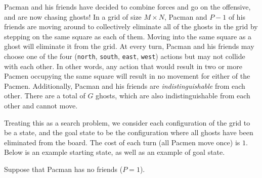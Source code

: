 \documentclass[11pt, a4paper]{exam}
\begin{document}
\begin{exercises}[1, 3 (a)--(c), 5]
Pacman and his friends have decided to combine forces and go on the offensive, and are now chasing ghosts! In a grid of size $M \times N$, Pacman and $P - 1$ of his friends are moving around to collectively eliminate all of the ghosts in the grid by stepping on the same square as each of them. Moving into the same square as a ghost will eliminate it from the grid. At every turn, Pacman and his friends may choose one of the four (\texttt{north}, \texttt{south}, \texttt{east}, \texttt{west}) actions but may not collide with each other. In other words, any action that would result in two or more Pacmen occupying the same square will result in no movement for either of the Pacmen. Additionally, Pacman and his friends are \emph{indistinguishable} from each other. There are a total of $G$ ghosts, which are also indistinguishable from each other and cannot move.

Treating this as a search problem, we consider each configuration of the grid to be a state, and the goal state to be the configuration where all ghosts have been eliminated from the board. The cost of each turn (all Pacmen move once) is $1$. Below is an example starting state, as well as an example of goal state.

\begin{center}
\end{center}

Suppose that Pacman has no friends ($P=1$).

\end{exercises}
\end{document}
